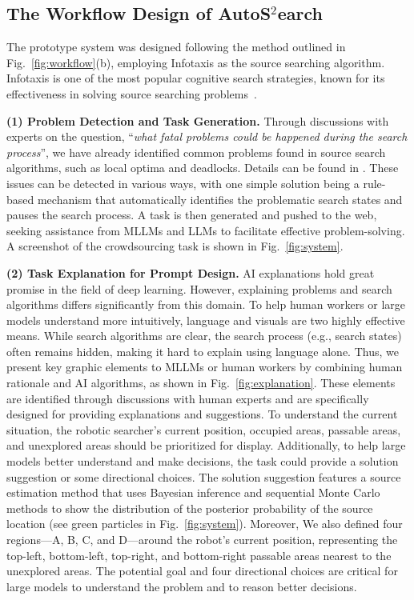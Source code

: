 \subsection{The Workflow Design of AutoS$^2$earch}

The prototype system was designed following the method outlined in Fig.~\ref{fig:workflow}(b), employing Infotaxis as the source searching algorithm. Infotaxis is one of the most popular cognitive search strategies, known for its effectiveness in solving source searching problems~\cite{ristic2016study}.

\textbf{(1) Problem Detection and Task Generation.} Through discussions with experts on the question, “\textit{what fatal problems could be happened during the search process}”, we have already identified common problems found in source search algorithms, such as local optima and deadlocks. Details can be found in \cite{zhao2023leveraging}. These issues can be detected in various ways, with one simple solution being a rule-based mechanism that automatically identifies the problematic search states and pauses the search process. A task is then generated and pushed to the web, seeking assistance from MLLMs and LLMs to facilitate effective problem-solving. A screenshot of the crowdsourcing task is shown in Fig.~\ref{fig:system}.

\textbf{(2) Task Explanation for Prompt Design.} AI explanations hold great promise in the field of deep learning. However, explaining problems and search algorithms differs significantly from this domain. To help human workers or large models understand more intuitively, language and visuals are two highly effective means. While search algorithms are clear, the search process (e.g., search states) often remains hidden, making it hard to explain using language alone. Thus, we present key graphic elements to MLLMs or human workers by combining human rationale and AI algorithms, as shown in Fig.~\ref{fig:explanation}. These elements are identified through discussions with human experts and are specifically designed for providing explanations and suggestions. To understand the current situation, the robotic searcher's current position, occupied areas, passable areas, and unexplored areas should be prioritized for display. Additionally, to help large models better understand and make decisions, the task could provide a solution suggestion or some directional choices. The solution suggestion features a source estimation method that uses Bayesian inference and sequential Monte
Carlo methods to show the distribution of the posterior probability of the source location (see green particles in Fig.~\ref{fig:system}). Moreover, We also defined four regions—A, B, C, and D—around the robot's current position, representing the top-left, bottom-left, top-right, and bottom-right passable areas nearest to the unexplored areas. The potential goal and four directional choices are critical for large models to understand the problem and to reason better decisions.

